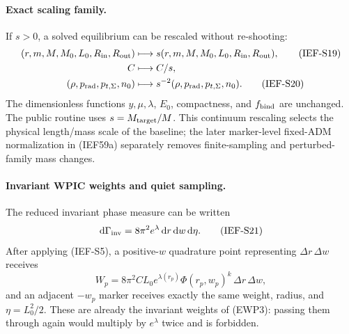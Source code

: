 \paragraph{Exact scaling family.}
If \(s>0\), a solved equilibrium can be rescaled without re-shooting:
\begin{align}
 (r,m,M,M_0,L_0,R_{\rm in},R_{\rm out})
 &\longmapsto
 s(r,m,M,M_0,L_0,R_{\rm in},R_{\rm out}),           \tag{IEF-S19}\\
 C&\longmapsto C/s,\notag\\
 (\rho,p_{\rm rad},p_{t,\Sigma},n_0)&\longmapsto
 s^{-2}(\rho,p_{\rm rad},p_{t,\Sigma},n_0).           \tag{IEF-S20}
\end{align}
The dimensionless functions \(y,\mu,\lambda\), \(E_0\), compactness, and
\(f_{\rm bind}\) are unchanged.  The public
 routine uses \(s=M_{\rm target}/M\).  This
continuum rescaling selects the physical length/mass scale of the baseline;
the later marker-level fixed-ADM normalization in (IEF59a) separately removes
finite-sampling and perturbed-family mass changes.

\paragraph{Invariant WPIC weights and quiet sampling.}
The reduced invariant phase measure can be written
\[
 \mathrm d\Gamma_{\rm inv}
 =8\pi^2e^\lambda\,\mathrm d r\,\mathrm d w\,\mathrm d\eta.
                                                               \tag{IEF-S21}
\]
After applying (IEF-S5), a positive-\(w\) quadrature point representing
\(\Delta r\,\Delta w\) receives
\[
 W_p=8\pi^2 CL_0 e^{\lambda(r_p)}
       \Phi(r_p,w_p)^k\,\Delta r\,\Delta w,              \tag{IEF-S22}
\]
and an adjacent \(-w_p\) marker receives exactly the same weight, radius, and
\(\eta=L_0^2/2\).  These are already the invariant weights of (EWP3):
passing them through
again would multiply by \(e^\lambda\) twice and is forbidden.

